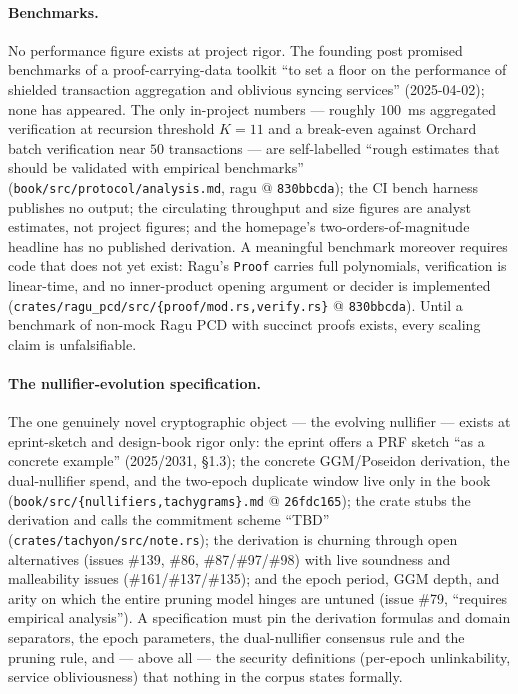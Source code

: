 \documentclass[11pt,a4paper]{article}
\theoremstyle{definition}
\begin{document}
\paragraph{Benchmarks.} No performance figure exists at project rigor. The
founding post promised benchmarks of a proof-carrying-data toolkit ``to set
a floor on the performance of shielded transaction aggregation and
oblivious syncing services'' (2025-04-02); none has appeared. The only
in-project numbers --- roughly $100$~ms aggregated verification at
recursion threshold $K = 11$ and a break-even against Orchard batch
verification near $50$ transactions --- are self-labelled ``rough estimates
that should be validated with empirical benchmarks''
(\texttt{book/src/protocol/analysis.md}, ragu @ \texttt{830bbcda}); the CI
bench harness publishes no output; the circulating throughput and size
figures are analyst estimates, not project figures; and the homepage's
two-orders-of-magnitude headline has no published derivation. A meaningful
benchmark moreover requires code that does not yet exist: Ragu's
\texttt{Proof} carries full polynomials, verification is linear-time, and
no inner-product opening argument or decider is implemented
(\texttt{crates/ragu\_pcd/src/\{proof/mod.rs,verify.rs\}} @
\texttt{830bbcda}). Until a benchmark of non-mock Ragu PCD with succinct
proofs exists, every scaling claim is unfalsifiable.

\paragraph{The nullifier-evolution specification.} The one genuinely novel
cryptographic object --- the evolving nullifier --- exists at
eprint-sketch and design-book rigor only: the eprint offers a PRF sketch
``as a concrete example'' (2025/2031, \S1.3); the concrete GGM/Poseidon
derivation, the dual-nullifier spend, and the two-epoch duplicate window
live only in the book (\texttt{book/src/\{nullifiers,tachygrams\}.md} @
\texttt{26fdc165}); the crate stubs the derivation and calls the commitment
scheme ``TBD'' (\texttt{crates/tachyon/src/note.rs}); the derivation is
churning through open alternatives (issues \#139, \#86, \#87/\#97/\#98)
with live soundness and malleability issues (\#161/\#137/\#135); and the
epoch period, GGM depth, and arity on which the entire pruning model hinges
are untuned (issue \#79, ``requires empirical analysis''). A specification
must pin the derivation formulas and domain separators, the epoch
parameters, the dual-nullifier consensus rule and the pruning rule, and ---
above all --- the security definitions (per-epoch unlinkability, service
obliviousness) that nothing in the corpus states formally.
\end{document}
